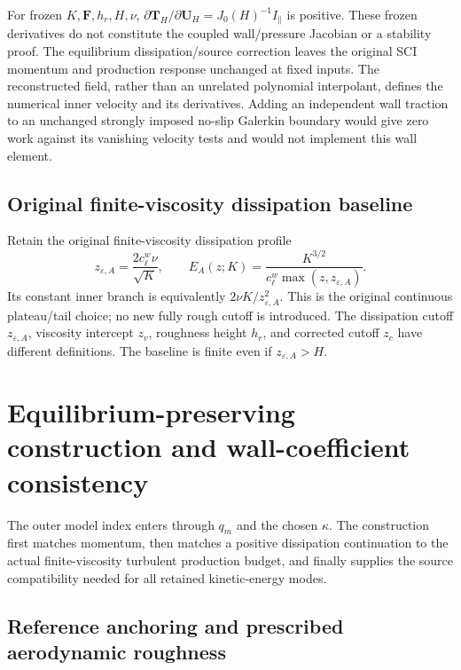 \documentclass[11pt,a4paper]{article}
\numberwithin{equation}{section}
\newcommand{\eps}{\varepsilon}
\begin{document}
For frozen $K,\boldsymbol F,h_r,H,\nu$,
$\partial\boldsymbol T_H/\partial\boldsymbol U_H
=J_0(H)^{-1}I_\parallel$ is positive. These frozen derivatives do
not constitute the coupled wall/pressure Jacobian or a stability proof.
The equilibrium dissipation/source correction leaves the original
SCI momentum and production response unchanged at fixed inputs.
The reconstructed field, rather than an unrelated polynomial
interpolant, defines the numerical inner velocity and its derivatives.
Adding an independent wall traction to an unchanged strongly imposed
no-slip Galerkin boundary would give zero work against its vanishing
velocity tests and would not implement this wall element.

\subsection{Original finite-viscosity dissipation baseline}
\label{awf:baseline}

Retain the original finite-viscosity dissipation profile
\begin{equation}
 \boxed{
 z_{\eps,A}=\frac{2c_\ell^w\nu}{\sqrt K},\qquad
 E_A(z;K)=\frac{K^{3/2}}{c_\ell^w\max(z,z_{\eps,A})}.
 }
 \label{awf:baseline-epsilon}
\end{equation}
Its constant inner branch is equivalently $2\nu K/z_{\eps,A}^2$.
This is the original continuous plateau/tail choice; no new
fully rough cutoff is introduced. The dissipation cutoff
$z_{\eps,A}$, viscosity intercept $z_v$, roughness height $h_r$,
and corrected cutoff $z_c$ have different definitions. The baseline
is finite even if $z_{\eps,A}>H$.


\section{Equilibrium-preserving construction and wall-coefficient consistency}
\label{awf:construction}

The outer model index enters through $q_m$ and the chosen $\kappa$.
The construction first matches momentum, then matches a positive
dissipation continuation to the actual finite-viscosity turbulent
production budget, and finally supplies the source compatibility
needed for all retained kinetic-energy modes.

\subsection{Reference anchoring and prescribed aerodynamic roughness}
\label{awf:anchor}
\end{document}
